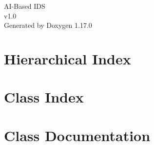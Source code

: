 \documentclass[twoside]{book}
\newcommand{\+}{\discretionary{\mbox{\scriptsize$\hookleftarrow$}}{}{}}
\newcommand{\clearemptydoublepage}{%
    \newpage{\pagestyle{empty}\cleardoublepage}%
  }
\begin{document}
  \raggedbottom
    \hypersetup{pageanchor=false,
                bookmarksnumbered=true,
                pdfencoding=unicode
               }
  \begin{titlepage}
  \vspace*{7cm}
  \begin{center}%
  {\Large AI-\/\+Based IDS}\\
  [1ex]\large v1.\+0 \\
  \vspace*{1cm}
  {\large Generated by Doxygen 1.17.0}\\
  \end{center}
  \end{titlepage}
  \clearemptydoublepage
  \tableofcontents
  \clearemptydoublepage
  \hypersetup{pageanchor=true}
\chapter{Hierarchical Index}

\chapter{Class Index}

\chapter{Class Documentation}

  \backmatter
  \newpage
  \clearemptydoublepage
  \printindex
\end{document}
